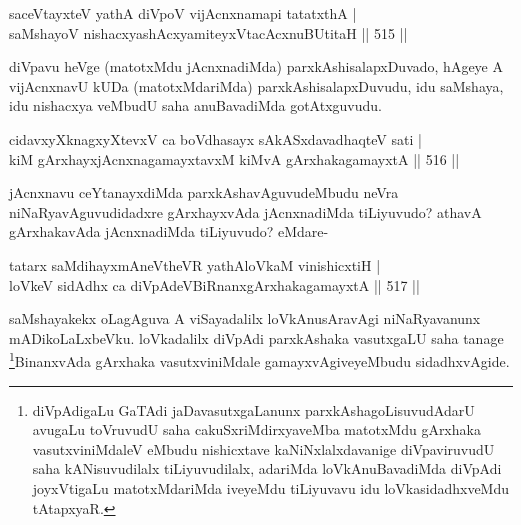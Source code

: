 
\begin{shl}
saceVtayxteV yathA diVpoV vijAcnxnamapi tatatxthA | \\
saMshayoV nishacxyashAcxyamiteyxVtacAcxnuBUtitaH \hfill||  515 ||  
\end{shl}

\begin{artha}
diVpavu heVge (matotxMdu jAcnxnadiMda) parxkAshisalapxDuvado, hAgeye A vijAcnxnavU kUDa (matotxMdariMda) parxkAshisalapxDuvudu, idu saMshaya, idu nishacxya veMbudU saha anuBavadiMda gotAtxguvudu.
\end{artha}


\begin{shl}
cidavxyXknagxyXtevxV ca boVdhasayx sAkASxdavadhaqteV sati | \\
kiM gArxhayxjAcnxnagamayxtavxM kiMvA gArxhakagamayxtA \hfill||  516 ||
\end{shl}

\begin{artha}
jAcnxnavu ceYtanayxdiMda parxkAshavAguvudeMbudu neVra niNaRyavAguvudidadxre gArxhayxvAda jAcnxnadiMda tiLiyuvudo? athavA gArxhakavAda jAcnxnadiMda tiLiyuvudo? eMdare-
\end{artha}

\begin{shl}
tatarx saMdihayxmAneV\s theVR yathAloVkaM vinishicxtiH | \\
loVkeV sidAdhx ca diVpAdeVBiRnanxgArxhakagamayxtA \hfill||  517 ||  
\end{shl}

\begin{artha}
saMshayakekx oLagAguva A viSayadalilx loVkAnusAravAgi niNaRyavanunx mADikoLaLxbeVku. loVkadalilx diVpAdi parxkAshaka vasutxgaLU saha tanage \footnote{diVpAdigaLu GaTAdi jaDavasutxgaLanunx parxkAshagoLisuvudAdarU avugaLu toVruvudU saha cakuSxriMdirxyaveMba matotxMdu gArxhaka vasutxviniMdaleV eMbudu nishicxtave kaNiNxlalxdavanige diVpaviruvudU saha kANisuvudilalx tiLiyuvudilalx, adariMda loVkAnuBavadiMda diVpAdi joyxVtigaLu matotxMdariMda iveyeMdu tiLiyuvavu idu loVkasidadhxveMdu tAtapxyaR.}BinanxvAda gArxhaka vasutxviniMdale gamayxvAgiveyeMbudu sidadhxvAgide.
\end{artha}

